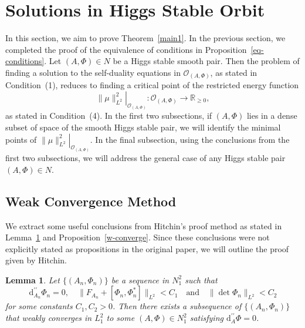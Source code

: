 \documentclass[a4paper]{amsart}
\newtheorem{lemma}[theorem]{Lemma}
\theoremstyle{definition}
\theoremstyle{remark}
\numberwithin{equation}{section}
\begin{document}
\section{Solutions in Higgs Stable Orbit}

In this section, we aim to prove Theorem~\ref{main1}. In the previous section, we completed the proof of the equivalence of conditions in Proposition~\ref{eq-conditions}. Let $(A, \Phi) \in N$ be a Higgs stable smooth pair. Then the problem of finding a solution to the self-duality equations in $\mathcal{O}_{(A, \Phi)}$, as stated in Condition~(1), reduces to finding a critical point of the restricted energy function  
\[
\left.\|\mu\|_{L^2}^2\right|_{\mathcal{O}_{(A, \Phi)}} \colon \mathcal{O}_{(A, \Phi)} \to \mathbb{R}_{\geq 0},
\]
as stated in Condition~(4). In the first two subsections, if $(A, \Phi)$ lies in a dense subset of space of the smooth Higgs stable pair, we will identify the minimal points of $\left.\|\mu\|_{L^2}^2\right|_{\mathcal{O}_{(A, \Phi)}}$. In the final subsection, using the conclusions from the first two subsections, we will address the general case of any Higgs stable pair $(A, \Phi) \in N$.

\subsection{Weak Convergence Method}

We extract some useful conclusions from Hitchin's proof method as stated in Lemma~\ref{weakconvergentsubseq} and Proposition~\ref{w-converge}. Since these conclusions were not explicitly stated as propositions in the original paper, we will outline the proof given by Hitchin. 

\begin{lemma}\label{weakconvergentsubseq}
Let $\{(A_n, \Phi_n)\}$ be a sequence in $N_1^2$ such that
\[
\mathrm{d}^{\prime\prime}_{A_n} \Phi_n = 0, \quad \|F_{A_n} + [\Phi_n, \Phi_n^*]\|_{L^2} < C_1\quad\text{and}\quad\|\det \Phi_n\|_{L^2} < C_2
\]
for some constants $C_1, C_2 > 0$. Then there exists a subsequence of $\{(A_n, \Phi_n)\}$ that weakly converges in $L_1^2$ to some $(A, \Phi) \in N_1^2$ satisfying $\mathrm{d}_A^{\prime\prime} \Phi = 0$.
\end{lemma}
\end{document}
